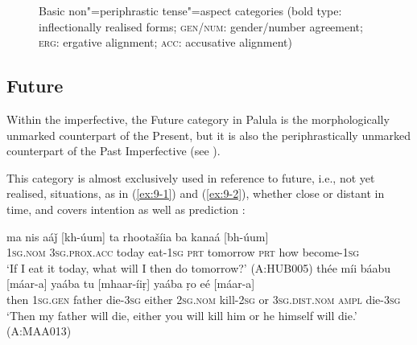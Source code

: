 \begin{figure}[ht]
\centering
{}
\caption{Basic non"=periphrastic tense"=aspect categories (bold type: inflectionally realised forms;
    \textsc{gen/num}: gender/number agreement; \textsc{erg}: ergative alignment; \textsc{acc}:
    accusative alignment)}
\label{fig:9-1}
\end{figure}

\subsection{Future}
\label{subsec:9-1-2}


Within the imperfective, the Future category in Palula is the morphologically unmarked counterpart of the Present, but it is also the periphrastically unmarked counterpart of the Past Imperfective (see ). 



This category is almost exclusively used in reference to future, i.e., not yet realised, situations, as in (\ref{ex:9-1}) and (\ref{ex:9-2}), whether close or distant in time, and covers intention as well as prediction \citep[105--108]{dahl1985}:


\begin{exe}
\ex
\label{ex:9-1}
\gll ma nis aáǰ [kh-úum] ta rhootašíia ba kanaá [bh-úum]\\
\textsc{1sg.nom} \textsc{3}\textsc{sg.prox.acc} today eat-\textsc{1sg} \textsc{prt} tomorrow  \textsc{prt} how become-\textsc{1sg}\\
\glt `If I eat it today, what will I then do tomorrow?' (A:HUB005)
\ex
\label{ex:9-2}
\gll thée míi báabu [máar-a] yaába tu [mhaar-íiṛ] yaába ṛo eé [máar-a] \\
then \textsc{1sg.gen} father die-\textsc{3sg} either \textsc{2sg.nom} kill-\textsc{2sg}  or \textsc{3sg.dist.nom} \textsc{ampl} die-\textsc{3sg}  \\
\glt `Then my father will die, either you will kill him or he himself will die.' (A:MAA013)
\end{exe}

